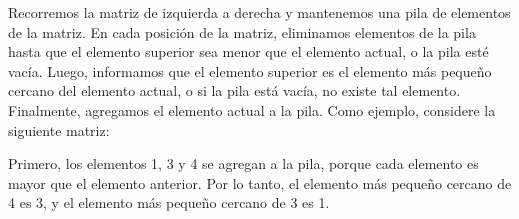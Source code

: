 Recorremos la matriz de izquierda a derecha
y mantenemos una pila de elementos de la matriz.
En cada posición de la matriz, eliminamos elementos de la pila
hasta que el elemento superior sea menor que el
elemento actual, o la pila esté vacía.
Luego, informamos que el elemento superior es
el elemento más pequeño cercano del elemento actual,
o si la pila está vacía, no existe tal elemento.
Finalmente, agregamos el elemento actual a la pila.
Como ejemplo, considere la siguiente matriz:
\begin{center}
\end{center}

Primero, los elementos 1, 3 y 4 se agregan a la pila,
porque cada elemento es mayor que el elemento anterior.
Por lo tanto, el elemento más pequeño cercano de 4 es 3,
y el elemento más pequeño cercano de 3 es 1.
\begin{center}
\end{center}


